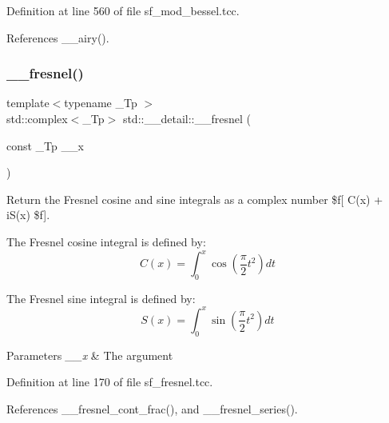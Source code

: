 Definition at line 560 of file sf\+\_\+mod\+\_\+bessel.\+tcc.



References \+\_\+\+\_\+airy().

\mbox{\label{namespacestd_1_1____detail_a322045015cfbde5a45e7718d533de60d}} 
\subsubsection{\texorpdfstring{\+\_\+\+\_\+fresnel()}{\_\_fresnel()}}
{\footnotesize\ttfamily template$<$typename \+\_\+\+Tp $>$ \\
std\+::complex$<$\+\_\+\+Tp$>$ std\+::\+\_\+\+\_\+detail\+::\+\_\+\+\_\+fresnel (\begin{DoxyParamCaption}\item[{const \+\_\+\+Tp}]{\+\_\+\+\_\+x }\end{DoxyParamCaption})}



Return the Fresnel cosine and sine integrals as a complex number \$f\mbox{[} C(x) + i\+S(x) \$f\mbox{]}. 

The Fresnel cosine integral is defined by\+: \[ C(x) = \int_0^x \cos(\frac{\pi}{2}t^2) dt \]

The Fresnel sine integral is defined by\+: \[ S(x) = \int_0^x \sin(\frac{\pi}{2}t^2) dt \]


\begin{DoxyParams}{Parameters}
{\em \+\_\+\+\_\+x} & The argument \\
\hline
\end{DoxyParams}


Definition at line 170 of file sf\+\_\+fresnel.\+tcc.



References \+\_\+\+\_\+fresnel\+\_\+cont\+\_\+frac(), and \+\_\+\+\_\+fresnel\+\_\+series().

\mbox{\label{namespacestd_1_1____detail_aeae8420e2fa1671f004066525adc99b6}} 
